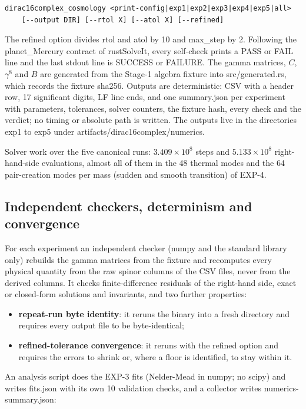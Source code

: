 \documentclass[11pt]{article}
\begin{document}
\begin{Verbatim}[fontsize=\small]
dirac16complex_cosmology <print-config|exp1|exp2|exp3|exp4|exp5|all>
    [--output DIR] [--rtol X] [--atol X] [--refined]
\end{Verbatim}

The refined option divides rtol and atol by 10 and max\_step by 2. Following the planet\_Mercury contract of rustSolveIt, every self-check prints a PASS or FAIL line and the last stdout line is SUCCESS or FAILURE. The gamma matrices, $C$, $\gamma^8$ and $B$ are generated from the Stage-1 algebra fixture into src/generated.rs, which records the fixture sha256. Outputs are deterministic: CSV with a header row, 17 significant digits, LF line ends, and one summary.json per experiment with parameters, tolerances, solver counters, the fixture hash, every check and the verdict; no timing or absolute path is written. The outputs live in the directories exp1 to exp5 under artifacts/dirac16complex/numerics.

Solver work over the five canonical runs: $3.409\times10^8$ steps and $5.133\times10^8$ right-hand-side evaluations, almost all of them in the 48 thermal modes and the 64 pair-creation modes per mass (sudden and smooth transition) of EXP-4.

\subsection{Independent checkers, determinism and convergence}

For each experiment an independent checker (numpy and the standard library only) rebuilds the gamma matrices from the fixture and recomputes every physical quantity from the raw spinor columns of the CSV files, never from the derived columns. It checks finite-difference residuals of the right-hand side, exact or closed-form solutions and invariants, and two further properties:

\begin{itemize}
\item \textbf{repeat-run byte identity}: it reruns the binary into a fresh directory and requires every output file to be byte-identical;
\item \textbf{refined-tolerance convergence}: it reruns with the refined option and requires the errors to shrink or, where a floor is identified, to stay within it.
\end{itemize}

An analysis script does the EXP-3 fits (Nelder-Mead in numpy; no scipy) and writes fits.json with its own 10 validation checks, and a collector writes numerics-summary.json:
\end{document}
